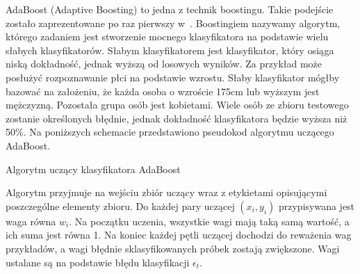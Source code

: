 AdaBoost (Adaptive Boosting) to jedna z technik boostingu.
Takie podejście zostało zaprezentowane po raz pierwszy w~\cite{Freund1996ExperimentsWA}.
Boostingiem nazywamy algorytm, którego zadaniem jest stworzenie mocnego klasyfikatora na podstawie wielu słabych klasyfikatorów.
Słabym klasyfikatorem jest klasyfikator, który osiąga niską dokładność, jednak wyższą od losowych wyników.
Za przykład może posłużyć rozpoznawanie płci na podstawie wzrostu.
Słaby klasyfikator mógłby bazować na założeniu, że każda osoba o wzroście 175cm lub wyższym jest mężczyzną.
Pozostała grupa osób jest kobietami.
Wiele osób ze zbioru testowego zostanie określonych błędnie, jednak dokładność klasyfikatora będzie wyższa niż 50\%.
Na poniższych schemacie przedstawiono pseudokod algorytmu uczącego AdaBoost.
\begin{algorithm}
    \caption{Algorytm uczący klasyfikatora AdaBoost}
\end{algorithm}
\FloatBarrier
Algorytm przyjmuje na wejściu zbiór uczący wraz z etykietami opisującymi poszczególne elementy zbioru.
Do każdej pary uczącej $(x_i, y_i)$ przypisywana jest waga równa $w_i$.
Na początku uczenia, wszystkie wagi mają taką samą wartość, a ich suma jest równa 1.
Na koniec każdej pętli uczącej dochodzi do reważenia wag przykładów, a wagi błędnie sklasyfikowanych próbek zostają zwiększone.
Wagi ustalane są na podstawie błędu klasyfikacji $\epsilon_t$.
